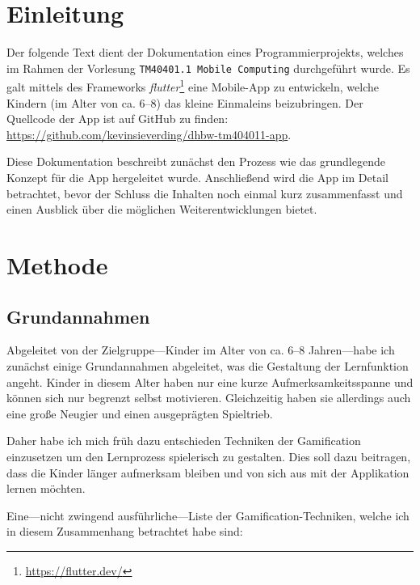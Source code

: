 
\section{Einleitung}\label{sec:introduction}

Der folgende Text dient der Dokumentation eines Programmierprojekts, welches im Rahmen der Vorlesung \texttt{TM40401.1 Mobile Computing} durchgeführt wurde.
Es galt mittels des Frameworks \emph{flutter}\footnote{\url{https://flutter.dev/}} eine Mobile-App zu entwickeln, welche Kindern (im Alter von ca. 6--8) das kleine Einmaleins beizubringen.
Der Quellcode der App ist auf GitHub zu finden: \url{https://github.com/kevinsieverding/dhbw-tm404011-app}.

Diese Dokumentation beschreibt zunächst den Prozess wie das grundlegende Konzept für die App hergeleitet wurde.
Anschließend wird die App im Detail betrachtet, bevor der Schluss die Inhalten noch einmal kurz zusammenfasst und einen Ausblick über die möglichen Weiterentwicklungen bietet.

\section{Methode}

\subsection{Grundannahmen}

Abgeleitet von der Zielgruppe---Kinder im Alter von ca. 6--8 Jahren---habe ich zunächst einige Grundannahmen abgeleitet, was die Gestaltung der Lernfunktion angeht.
Kinder in diesem Alter haben nur eine kurze Aufmerksamkeitsspanne und können sich nur begrenzt selbst motivieren. Gleichzeitig haben sie allerdings auch eine große Neugier und einen ausgeprägten Spieltrieb.

Daher habe ich mich früh dazu entschieden Techniken der Gamification einzusetzen um den Lernprozess spielerisch zu gestalten.
Dies soll dazu beitragen, dass die Kinder länger aufmerksam bleiben und von sich aus mit der Applikation lernen möchten.

Eine---nicht zwingend ausführliche---Liste der Gamification-Techniken, welche ich in diesem Zusammenhang betrachtet habe sind:

